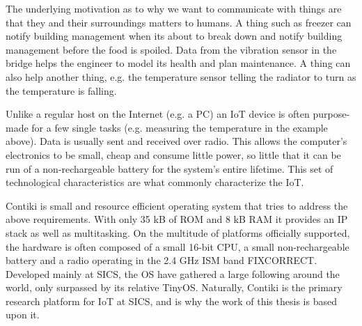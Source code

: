 \documentclass[final,letterpaper,twoside,12pt,twocolumn]{report}
\begin{document}
The underlying motivation as to why we want to communicate with things are that they and their surroundings matters to humans. A thing such as freezer can notify building management when its about to break down and notify building management before the food is spoiled. Data from the vibration sensor in the bridge helps the engineer to model its health and plan maintenance. A thing can also help another thing, e.g. the temperature sensor telling the radiator to turn as the temperature is falling.


Unlike a regular host on the Internet (e.g. a PC) an IoT device is often purpose-made for a few single tasks (e.g. measuring the temperature in the example above). Data is usually sent and received over radio. This allows the computer's electronics to be small, cheap and consume little power, so little that it can be run of a non-rechargeable battery for the system's entire lifetime. This set of technological characteristics are what commonly characterize the IoT.


Contiki is small and resource efficient operating system that tries to address the above requirements. With only 35 kB of ROM and 8 kB RAM it provides an IP stack as well as multitasking. On the multitude of platforms officially supported, the hardware is often composed of a small 16-bit CPU, a small non-rechargeable battery and a radio operating in the 2.4 GHz ISM band FIXCORRECT. Developed mainly at SICS, the OS have gathered a large following around the world, only surpassed by its relative TinyOS. Naturally, Contiki is the primary research platform for IoT at SICS, and is why the work of this thesis is based upon it.


\end{document}
